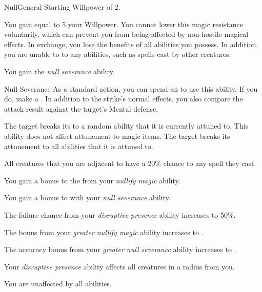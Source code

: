    \begin{feat}{Null}{General}
        \featpre Starting Willpower of 2.

         You gain  equal to 5 \add your Willpower.
        You cannot lower this magic resistance voluntarily, which can prevent you from being affected by non-hostile magical effects.
        In exchange, you lose the benefits of all  abilities you possess.
        In addition, you are unable to  to any  abilities, such as spells cast by other creatures.

         You gain the \textit{null severance} ability.
        \begin{ability}{Null Severance}
            As a standard action, you can spend an  to use this ability.
            If you do, make a .
            In addition to the strike's normal effects, you also compare the attack result against the target's Mental defense.

            \hit The target breaks its  to a random ability that it is currently attuned to.
            This ability does not affect attunement to magic items.
            \crit The target breaks its attunement to all abilities that it is attuned to.
        \end{ability}

         All creatures that you are adjacent to have a 20\% chance to  any spell they cast.

         You gain a  bonus to the  from your \textit{nullify magic} ability.

         You gain a  bonus to  with your \textit{null severance} ability.

         The failure chance from your \textit{disruptive presence} ability increases to 50\%.

         The bonus from your \textit{greater nullify magic} ability increases to .

         The accuracy bonus from your \textit{greater null severance} ability increases to .

         Your \textit{disruptive presence} ability affects all creatures in a \areamed radius  from you.

         You are unaffected by all  abilities.
    \end{feat}

